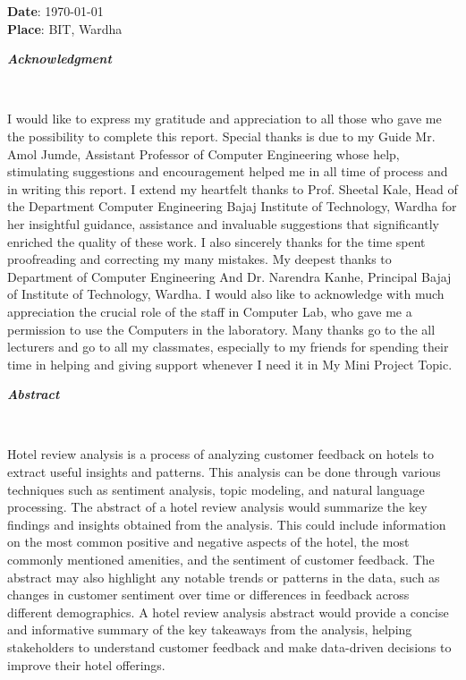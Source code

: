 \documentclass[a4paper, 12pt]{report}
\begin{document}
\begin{frontmatter}
{\flushleft
\textbf{Date}: \today\\
\textbf{Place}: BIT, Wardha  
}
\newpage
\thispagestyle{empty}
\begin{center}
	\begin{LARGE}
		\textbf{\textit {Acknowledgment}}\end{LARGE}\\[1.2cm]
\end{center}
I would like to express my gratitude and appreciation to all those who gave me the
possibility to complete this report. Special thanks is due to my Guide Mr. Amol Jumde, Assistant Professor of Computer Engineering whose help, stimulating suggestions and encouragement helped me in all
time of process and in writing this report. I extend my heartfelt thanks to Prof. Sheetal Kale, Head of the Department Computer Engineering Bajaj Institute of Technology, Wardha for her insightful guidance, assistance and invaluable suggestions that significantly enriched the quality of these work.  I also sincerely thanks for the time spent proofreading and correcting my many mistakes. My deepest thanks to Department of Computer Engineering And Dr. Narendra Kanhe,
Principal Bajaj of Institute of Technology, Wardha. I would also like to acknowledge
with much appreciation the crucial role of the staff in Computer Lab, who gave me a
permission to use the Computers in the laboratory. Many thanks go to the all lecturers
and go to all my classmates, especially to my friends for spending their time in helping
and giving support whenever I need it in My Mini Project Topic.
\\


\newpage
\thispagestyle{empty}
\begin{center}
	\begin{LARGE}
		\textbf{\textit {Abstract}}\end{LARGE}\\[1.2cm]
\end{center}

Hotel review analysis is a process of analyzing customer feedback on hotels to extract useful insights and 
patterns. This analysis can be done through various techniques such as sentiment analysis, topic modeling, and 
natural language processing. The abstract of a hotel review analysis would summarize the key findings and 
insights obtained from the analysis. This could include information on the most common positive and negative 
aspects of the hotel, the most commonly mentioned amenities, and the sentiment of customer feedback. The 
abstract may also highlight any notable trends or patterns in the data, such as changes in customer sentiment 
over time or differences in feedback across different demographics. A hotel review analysis abstract would 
provide a concise and informative summary of the key takeaways from the analysis, helping stakeholders to 
understand customer feedback and make data-driven decisions to improve their hotel offerings.
\\


\end{frontmatter}
\end{document}
